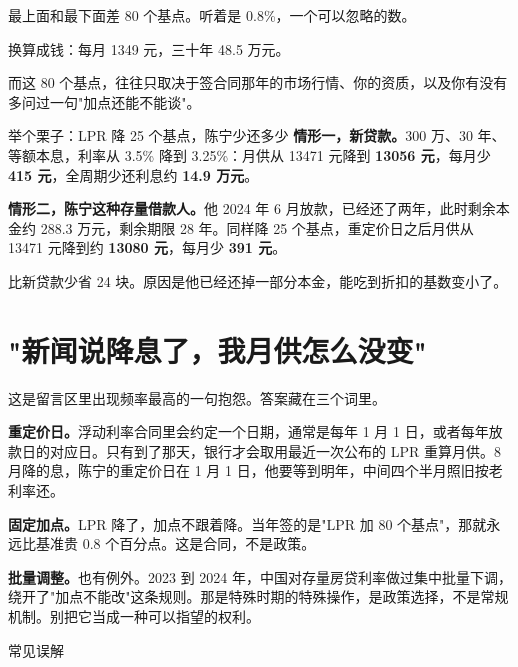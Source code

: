 \begin{barfig}
\end{barfig}

最上面和最下面差 80 个基点。听着是 0.8\%，一个可以忽略的数。

换算成钱：每月 1349 元，三十年 48.5 万元。

而这 80 个基点，往往只取决于签合同那年的市场行情、你的资质，以及你有没有多问过一句"加点还能不能谈"。

\begin{egbox}{举个栗子：LPR 降 25 个基点，陈宁少还多少}
\textbf{情形一，新贷款。}300 万、30 年、等额本息，利率从 3.5\% 降到 3.25\%：月供从 13471 元降到 \textbf{13056 元}，每月少 \textbf{415 元}，全周期少还利息约 \textbf{14.9 万元}。

\textbf{情形二，陈宁这种存量借款人。}他 2024 年 6 月放款，已经还了两年，此时剩余本金约 288.3 万元，剩余期限 28 年。同样降 25 个基点，重定价日之后月供从 13471 元降到约 \textbf{13080 元}，每月少 \textbf{391 元}。

比新贷款少省 24 块。原因是他已经还掉一部分本金，能吃到折扣的基数变小了。

\end{egbox}

\section{"新闻说降息了，我月供怎么没变"}

这是留言区里出现频率最高的一句抱怨。答案藏在三个词里。

\textbf{重定价日。}浮动利率合同里会约定一个日期，通常是每年 1 月 1 日，或者每年放款日的对应日。只有到了那天，银行才会取用最近一次公布的 LPR 重算月供。8 月降的息，陈宁的重定价日在 1 月 1 日，他要等到明年，中间四个半月照旧按老利率还。

\textbf{固定加点。}LPR 降了，加点不跟着降。当年签的是"LPR 加 80 个基点"，那就永远比基准贵 0.8 个百分点。这是合同，不是政策。

\textbf{批量调整。}也有例外。2023 到 2024 年，中国对存量房贷利率做过集中批量下调，绕开了"加点不能改"这条规则。那是特殊时期的特殊操作，是政策选择，不是常规机制。别把它当成一种可以指望的权利。

\begin{mythbox}{常见误解}
\end{mythbox}

